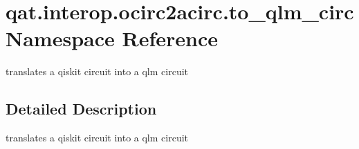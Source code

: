 \hypertarget{namespaceqat_1_1interop_1_1ocirc2acirc_1_1to__qlm__circ}{\section{qat.\-interop.\-ocirc2acirc.\-to\-\_\-qlm\-\_\-circ Namespace Reference}
\label{namespaceqat_1_1interop_1_1ocirc2acirc_1_1to__qlm__circ}
}


translates a qiskit circuit into a qlm circuit  




\subsection{Detailed Description}
translates a qiskit circuit into a qlm circuit 